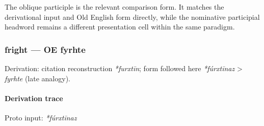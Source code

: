 \documentclass[
  british,
  a4paper,
]{article}
\begin{document}
The oblique participle is the relevant comparison form. It matches the
derivational input and Old English form directly, while the nominative
participial headword remains a different presentation cell within the
same paradigm.

\subsubsection{fright --- OE fyrhte}\label{fright-oe-fyrhte}

Derivation: citation reconstruction \emph{*furxtīn}; form followed here
\emph{*fúrxtīnaz} \textgreater{} \emph{fyrhte} (late analogy).

\paragraph{Derivation trace}\label{derivation-trace-44}

Proto input: \emph{*fúrxtīnaz}

\begingroup
\setlength{\fboxsep}{6pt}
\end{document}
